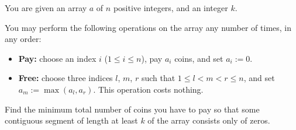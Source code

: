 You are given an array $a$ of $n$ positive integers, and an integer $k$.

You may perform the following operations on the array any number of times, in any order:

\begin{itemize}
  \item \textbf{Pay:} choose an index $i$ ($1 \le i \le n$), pay $a_i$ coins, and set $a_i := 0$.
  \item \textbf{Free:} choose three indices $l$, $m$, $r$ such that $1 \le l < m < r \le n$, and set $a_m := \max(a_l, a_r)$. This operation costs nothing.
\end{itemize}

Find the minimum total number of coins you have to pay so that some contiguous segment of length at least $k$ of the array consists only of zeros.
